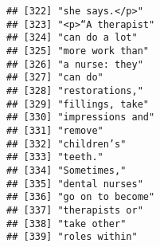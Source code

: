 \documentclass[]{article}
\begin{document}
\begin{verbatim}
## [322] "she says.</p>"                                                                                                                            
## [323] "<p>“A therapist"                                                                                                                          
## [324] "can do a lot"                                                                                                                             
## [325] "more work than"                                                                                                                           
## [326] "a nurse: they"                                                                                                                            
## [327] "can do"                                                                                                                                   
## [328] "restorations,"                                                                                                                            
## [329] "fillings, take"                                                                                                                           
## [330] "impressions and"                                                                                                                          
## [331] "remove"                                                                                                                                   
## [332] "children’s"                                                                                                                               
## [333] "teeth."                                                                                                                                   
## [334] "Sometimes,"                                                                                                                               
## [335] "dental nurses"                                                                                                                            
## [336] "go on to become"                                                                                                                          
## [337] "therapists or"                                                                                                                            
## [338] "take other"                                                                                                                               
## [339] "roles within"                                                                                                                             

\end{verbatim}
\end{document}
